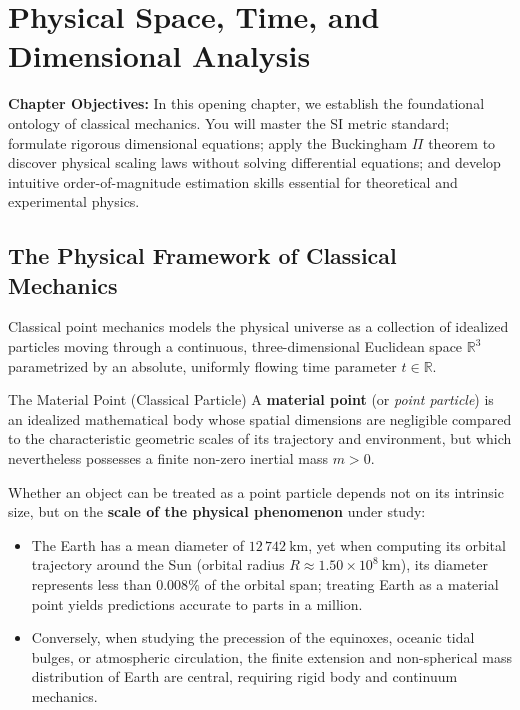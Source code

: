 \chapter{Physical Space, Time, and Dimensional Analysis}
\label{ch:foundations}

\begin{chapterintro}
\textbf{Chapter Objectives:} In this opening chapter, we establish the foundational ontology of classical mechanics. You will master the SI metric standard; formulate rigorous dimensional equations; apply the Buckingham $\Pi$ theorem to discover physical scaling laws without solving differential equations; and develop intuitive order-of-magnitude estimation skills essential for theoretical and experimental physics.
\end{chapterintro}

\section{The Physical Framework of Classical Mechanics}

Classical point mechanics models the physical universe as a collection of idealized particles moving through a continuous, three-dimensional Euclidean space $\mathbb{R}^3$ parametrized by an absolute, uniformly flowing time parameter $t \in \mathbb{R}$.

\begin{definitionbox}{The Material Point (Classical Particle)}
A \textbf{material point} (or \emph{point particle}) is an idealized mathematical body whose spatial dimensions are negligible compared to the characteristic geometric scales of its trajectory and environment, but which nevertheless possesses a finite non-zero inertial mass $m > 0$.
\end{definitionbox}

Whether an object can be treated as a point particle depends not on its intrinsic size, but on the \textbf{scale of the physical phenomenon} under study:
\begin{itemize}[leftmargin=1.4em,itemsep=3pt]
  \item The Earth has a mean diameter of $12\,742\ \mathrm{km}$, yet when computing its orbital trajectory around the Sun (orbital radius $R \approx 1.50\times 10^8\ \mathrm{km}$), its diameter represents less than $0.008\%$ of the orbital span; treating Earth as a material point yields predictions accurate to parts in a million.
  \item Conversely, when studying the precession of the equinoxes, oceanic tidal bulges, or atmospheric circulation, the finite extension and non-spherical mass distribution of Earth are central, requiring rigid body and continuum mechanics.
\end{itemize}

